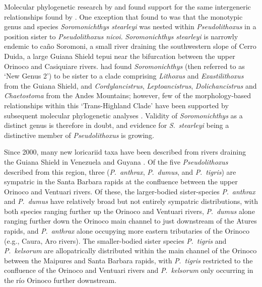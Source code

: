 \documentclass[12pt]{article}
\begin{document}
Molecular phylogenetic research by \citet{Covain2012} and \citet{Lujan2015phylo} found support for the same intergeneric relationships found by \citet{Armbruster2008}. %
One exception that \citet{Lujan2015phylo} found to \citet{Armbruster2008} was that the monotypic genus and species \emph{Soromonichthys stearleyi} \citet{Lujan2011sorom} was nested within \emph{Pseudolithoxus} in a position sister to \emph{Pseudolithoxus nicoi}. %
\emph{Soromonichthys stearleyi} is narrowly endemic to caño Soromoni, a small river draining the southwestern slope of Cerro Duida, a large Guiana Shield tepui near the bifurcation between the upper Orinoco and Casiquiare rivers. %
\citet{Armbruster2008} had found \emph{Soromonichthys} (then referred to as `New Genus 2') to be sister to a clade comprising \emph{Lithoxus} and \emph{Exastilithoxus} from the Guiana Shield, and \emph{Cordylancistrus}, \emph{Leptoancistrus}, \emph{Dolichancistrus} and \emph{Chaetostoma} from the Andes Mountains; however, few of the morphology-based relationships within this `Trans-Highland Clade' \citep[sensu][]{Lujan2011book,Lujan2011sorom} have been supported by subsequent molecular phylogenetic analyses \citep{Lujan2015phylo,Lujan2015chaeto}. %
Validity of \emph{Soromonichthys} as a distinct genus is therefore in doubt, and evidence for \emph{S}.\ \emph{stearleyi} being a distinctive member of \emph{Pseudolithoxus} is growing.%

Since 2000, many new loricariid taxa have been described from rivers draining the Guiana Shield in Venezuela and Guyana \citep{Armbruster2004,Armbruster2008pseud,Lujan2011sorom,Lujan2009}. %
 Of the five \emph{Pseudolithoxus} described from this region, three (\emph{P}.\ \emph{anthrax}, \emph{P}.\ \emph{dumus}, and \emph{P}.\ \emph{tigris}) are sympatric in the Santa Barbara rapids at the confluence between the upper Orinoco and Ventuari rivers. %
 Of these, the larger-bodied sister-species \emph{P}.\ \emph{anthrax} and \emph{P}.\ \emph{dumus} have relatively broad but not entirely sympatric distributions, with both species ranging further up the Orinoco and Ventuari rivers, \emph{P}.\ \emph{dumus} alone ranging further down the Orinoco main channel to just downstream of the Atures rapids, and \emph{P}.\ \emph{anthrax} alone occupying more eastern tributaries of the Orinoco (e.g., Caura, Aro rivers). %
 The smaller-bodied sister species \emph{P}.\ \emph{tigris} and \emph{P}.\ \emph{kelsorum} are allopatrically distributed within the main channel of the Orinoco between the Maipures and Santa Barbara rapids, with \emph{P}.\ \emph{tigris} restricted to the confluence of the Orinoco and Ventuari rivers and \emph{P}.\ \emph{kelsorum} only occurring in the río Orinoco further downstream.%
 
\end{document}
